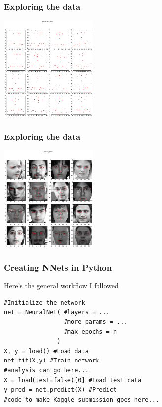 \documentclass{beamer}
\begin{document}
\begin{frame}[fragile]
\frametitle{Exploring the data}
\includegraphics[width=180px]{fk_coord.png}
\end{frame}

\begin{frame}[fragile]
\frametitle{Exploring the data}
\includegraphics[width=180px]{fk_example.png}
\end{frame}


\begin{frame}[fragile]
\frametitle{Creating NNets in Python}
\begin{block}{Here's the general workflow I followed}
\begin{verbatim}
#Initialize the network
net = NeuralNet( #layers = ...
                 #more params = ...
                 #max_epochs = n
               )
X, y = load() #Load data
net.fit(X,y) #Train network
#analysis can go here...
X = load(test=false)[0] #Load test data
y_pred = net.predict(X) #Predict
#code to make Kaggle submission goes here...
\end{verbatim}
\end{block}
\end{frame}
\end{document}
